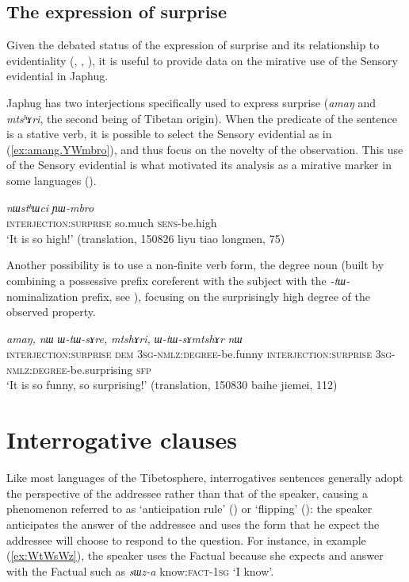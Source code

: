 \documentclass[11pt]{article}
\newcommand{\ipa}[1]{{\phon\textit{#1}}} %
\newcommand{\refb}[1]{(\ref{#1})}
\begin{document}
\subsection{The expression of surprise}
Given the debated status of the expression of surprise and its relationship to evidentiality (\citealt{hill12mirativity}, \citealt{delancey12still}, \citealt{aikhenvald12mirativity}), it is useful to provide data on the mirative use of the Sensory evidential in Japhug. 

Japhug has two interjections specifically used to express surprise (\ipa{amaŋ} and \ipa{mtsʰɤri}, the second being of Tibetan origin). When the predicate of the sentence is a stative verb, it is possible to select the Sensory evidential as in \refb{ex:amang.YWmbro}, and thus focus on the novelty of the observation. This use of the Sensory evidential is what motivated its analysis as a mirative marker in some languages (\citealt{hill12mirativity}).

\begin{exe}
\ex \label{ex:amang.YWmbro}
 \gll \ipa{amaŋ,}	\ipa{nɯstʰɯci}	\ipa{ɲɯ-mbro} \\
 \textsc{interjection:surprise} so.much \textsc{sens}-be.high \\
 \glt `It is so high!' (translation, 150826 liyu tiao longmen, 75)
\end{exe}

Another possibility is to use a non-finite verb form, the degree noun (built by combining a possessive prefix coreferent with the subject with the \ipa{-tɯ-} nominalization prefix, see \citealt[10-11]{jacques16comparative}), focusing on the surprisingly high degree of the observed property.

\begin{exe}
\ex \label{ex:amang.WtWsAre}
 \gll 
\ipa{amaŋ,}	\ipa{nɯ}	\ipa{ɯ-tɯ-sɤre,}	\ipa{mtshɤri,}	\ipa{ɯ-tɯ-sɤmtshɤr}	\ipa{nɯ}	\\
 \textsc{interjection:surprise} \textsc{dem} \textsc{3sg-nmlz:degree}-be.funny  \textsc{interjection:surprise} \textsc{3sg-nmlz:degree}-be.surprising \textsc{sfp} \\
 \glt `It is so funny, so surprising!' (translation, 150830 baihe jiemei, 112)
\end{exe}
\section{Interrogative clauses} \label{sec:interrogative}
Like most languages of the Tibetosphere, interrogatives sentences generally adopt the perspective of the addressee rather than that of the speaker, causing a phenomenon referred to as `anticipation rule' (\citealt[244]{tournadre14evidentiality}) or `flipping' (\citealt{sanroque17interrogativity}):   the speaker anticipates the answer of the addressee and uses the form that he expect the addressee will choose to respond to the question. For instance, in example \refb{ex:WtWsWz}, the speaker uses the Factual because she expects and answer with the Factual such as \ipa{sɯz-a} know:\textsc{fact}-\textsc{1sg} `I know'.
\end{document}
